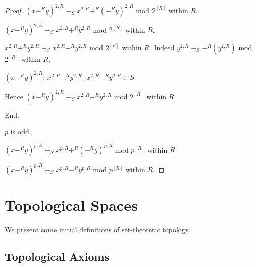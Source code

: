 \documentclass[english,11pt]{article}
\begin{document}
\begin{forthel}
\begin{proof}
$(x -^{R} y)^{2,R} \equiv_{S} x^{2,R} +^{R} (-^{R}y)^{2,R}$ mod $2^{[R]}$ within $R$.

$(x -^{R} y)^{2,R} \equiv_{S} x^{2,R} +^{R} y^{2,R}$ mod $2^{[R]}$ within $R$.

$x^{2,R} +^{R} y^{2,R} \equiv_{S} x^{2,R} -^{R} y^{2,R}$ mod $2^{[R]}$ within $R$.
Indeed $y^{2,R} \equiv_{S} -^{R}(y^{2,R})$ mod $2^{[R]}$ within $R$.

$(x -^{R} y)^{2,R}$, $x^{2,R} +^{R} y^{2,R}$, 
$x^{2,R} -^{R} y^{2,R} \in S$.

Hence $(x -^{R} y)^{2,R} \equiv_{S} x^{2,R} -^{R} y^{2,R}$ mod $2^{[R]}$ within $R$.

End. 

$p$ is odd.

$(x -^{R} y)^{p,R} \equiv_{S} x^{p,R} +^{R} (-^{R}y)^{p,R}$ mod $p^{[R]}$ within $R$.

$(x -^{R} y)^{p,R} \equiv_{S} x^{p,R} -^{R} y^{p,R}$ mod $p^{[R]}$ within $R$.
\end{proof}
\end{forthel}

\section{Topological Spaces}

We present some initial definitions of set-theoretic topology.

\subsection{Topological Axioms}
\end{document}

